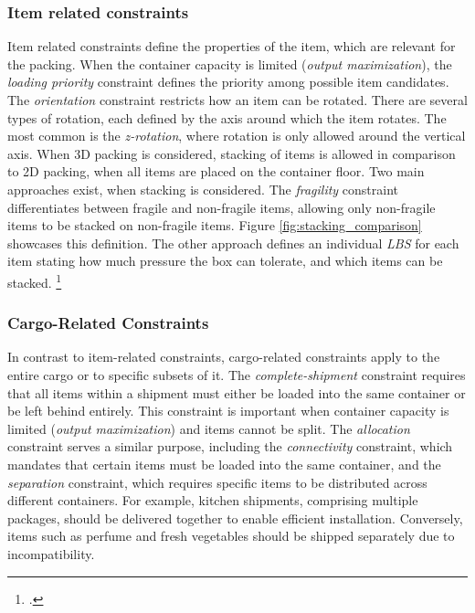 \subsubsection{Item related constraints}
Item related constraints define the properties of the item, which are relevant
for the packing. When the container capacity is limited (\textit{output maximization}),
the \textit{loading priority} constraint defines the priority among possible
item candidates. The \textit{orientation} constraint restricts how an item can be rotated.
There are several types of rotation, each defined by the axis around which the item rotates.
The most common is the \textit{z-rotation}, where rotation is only allowed around the vertical axis.
When 3D packing is considered, stacking of items is allowed in comparison to 2D packing, when all
items are placed on the container floor. Two main approaches exist, when stacking is considered.
The \textit{fragility} constraint differentiates between fragile and non-fragile items,
allowing only non-fragile items to be stacked on non-fragile items. Figure \ref{fig:stacking_comparison} showcases
this definition. The other approach defines an individual \textit{\gls{LBS}} for each
item stating how much pressure the box can tolerate, and which items can be stacked. \footcite[cf.][p. 847f]{krebs_advanced_2021}



\subsubsection{Cargo-Related Constraints}
In contrast to item-related constraints, cargo-related constraints apply to
the entire cargo or to specific subsets of it. The \textit{complete-shipment} constraint
requires that all items within a shipment must either be loaded into the same
container or be left behind entirely. This constraint is important
when container capacity is limited (\textit{output maximization}) and items
cannot be split. The \textit{allocation} constraint serves a similar purpose,
including the \textit{connectivity} constraint, which mandates that
certain items must be loaded into the same container, and the
\textit{separation} constraint, which requires specific items to
be distributed across different containers. For example, kitchen
shipments, comprising multiple packages, should be delivered together
to enable efficient installation. Conversely, items such as perfume and fresh
vegetables should be shipped separately due to incompatibility.

